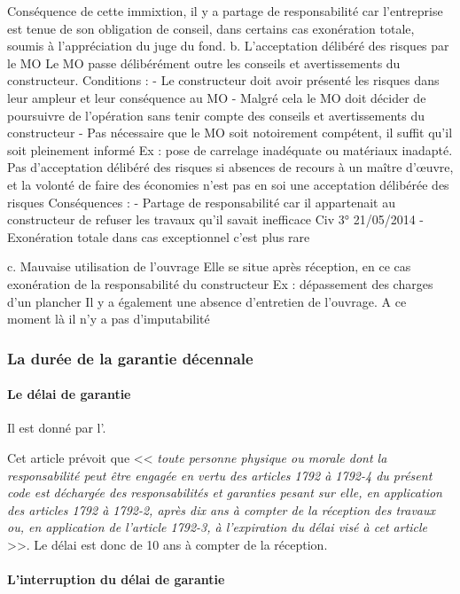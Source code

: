 		Conséquence de cette immixtion, il y a partage de responsabilité car l’entreprise est tenue de son obligation de conseil, dans certains cas exonération totale, soumis à l’appréciation du juge du fond.
		b.	L’acceptation délibéré des risques par le MO
		Le MO passe délibérément outre les conseils et avertissements du constructeur.
		Conditions :
		-	Le constructeur doit avoir présenté les risques dans leur ampleur et leur conséquence au MO
		-	Malgré cela le MO doit décider de poursuivre de l’opération sans tenir compte des conseils et avertissements du constructeur
		-	Pas nécessaire que le MO soit notoirement compétent, il suffit qu’il soit pleinement informé
		Ex : pose de carrelage inadéquate ou matériaux inadapté.
		Pas d’acceptation délibéré des risques si absences de recours à un maître d’œuvre, et la volonté de faire des économies n’est pas en soi une acceptation délibérée des risques
		Conséquences :
		-	Partage de responsabilité car il appartenait au constructeur de refuser les travaux qu’il savait inefficace Civ 3° 21/05/2014
		-	Exonération totale dans cas exceptionnel c’est plus rare

		c.	Mauvaise utilisation de l’ouvrage
		Elle se situe après réception, en ce cas exonération de la responsabilité du constructeur
		Ex : dépassement des charges d’un plancher
		Il y a également une absence d’entretien de l’ouvrage. A ce moment là il n’y a pas d’imputabilité


		\subsubsection{La durée de la garantie décennale}

			\paragraph{Le délai de garantie} Il est donné par l'.

			Cet article prévoit que << {\itshape toute personne physique ou morale dont la responsabilité peut être engagée en vertu des articles 1792 à 1792-4 du présent code est déchargée des responsabilités et garanties pesant sur elle, en application des articles 1792 à 1792-2, après dix ans à compter de la réception des travaux ou, en application de l'article 1792-3, à l'expiration du délai visé à cet article} >>. Le délai est donc de 10 ans à compter de la réception.

			\paragraph{L'interruption du délai de garantie}

